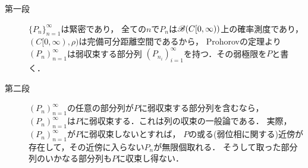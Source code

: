 	\begin{sketch}\mbox{}
		\begin{description}
			\item[第一段]
				$\{P_n\}_{n=1}^\infty$は緊密であり，
				全ての$n$で$P_n$は$\mathscr{B}(C[0,\infty))$上の確率測度であり，
				$(C[0,\infty),\rho)$は完備可分距離空間であるから，
				Prohorovの定理より$(P_n)_{n=1}^\infty$は弱収束する部分列
				$\left(P_{n_i}\right)_{i=1}^\infty$を持つ．その弱極限を$P$と書く．
				
			\item[第二段]
				$(P_n)_{n=1}^\infty$の任意の部分列が$P$に弱収束する部分列を含むなら，
				$(P_n)_{n=1}^\infty$は$P$に弱収束する．これは列の収束の一般論である．
				実際，$(P_n)_{n=1}^\infty$が$P$に弱収束しないとすれば，
				$P$の或る(弱位相に関する)近傍が存在して，その近傍に入らない$P_n$が無限個取れる．
				そうして取った部分列のいかなる部分列も$P$に収束し得ない．
				

\end{description}
\end{sketch}
